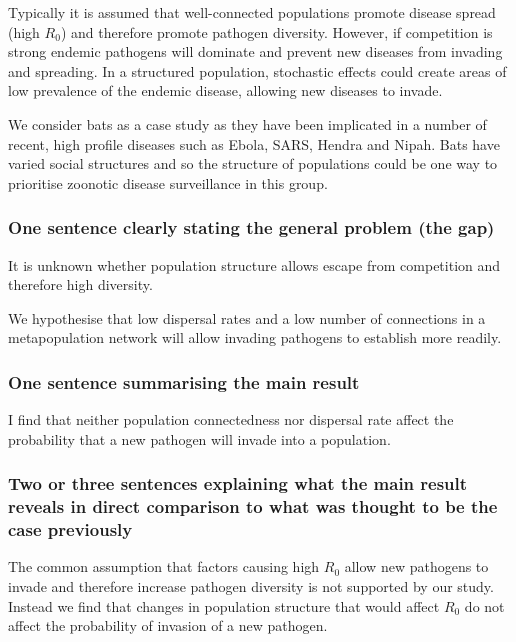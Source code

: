 Typically it is assumed that well-connected populations promote disease spread (high $R_0$) and therefore promote pathogen diversity.
However, if competition is strong endemic pathogens will dominate and prevent new diseases from invading and spreading. \cite{ackleh2003competitive,bremermann1989competitive,martcheva2013competitive,qiu2013vector}
In a structured population, stochastic effects could create areas of low prevalence of the endemic disease, allowing new diseases to invade.

We consider bats as a case study as they have been implicated in a number of recent, high profile diseases such as Ebola, SARS, Hendra and Nipah.
Bats have varied social structures and so the structure of populations could be one way to prioritise zoonotic disease surveillance in this group.

\subsubsection{One sentence clearly stating the general problem (the gap)}
It is unknown whether population structure allows escape from competition and therefore high diversity.

We hypothesise that low dispersal rates and a low number of connections in a metapopulation network will allow invading pathogens to establish more readily. 

\subsubsection{One sentence summarising the main result}
I find that neither population connectedness nor dispersal rate affect the probability that a new pathogen will invade into a population.

\subsubsection{Two or three sentences explaining what the main result reveals in direct comparison to what was thought to be the case previously}
The common assumption that factors causing high $R_0$ allow new pathogens to invade and therefore increase pathogen diversity is not supported by our study.
Instead we find that changes in population structure that would affect $R_0$ do not affect the probability of invasion of a new pathogen.


